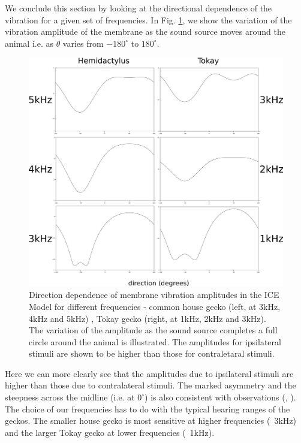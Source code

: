 We conclude this section by looking at the directional dependence of the vibration for a given set of frequencies. In Fig. \ref{directionplots}, we show the variation of the vibration amplitude of the membrane as
the sound source moves around the animal i.e. as $\theta$ varies from $-180^\circ$ to $180^\circ$.
\begin{figure}[ht!]
\centering
  \includegraphics[width=.5\linewidth]{Diagrams/Plots/directionplots/directionplots.png}
  \caption[Direction dependence of membrane vibration amplitudes for different frequencies.]{Direction dependence of membrane vibration amplitudes  in the ICE Model for different frequencies - common house gecko (left, at 3kHz, 4kHz and 5kHz)
  , Tokay gecko (right, at 1kHz, 2kHz and 3kHz).
  The variation of the amplitude as the sound source completes a full circle around the animal is illustrated. The amplitudes for ipsilateral stimuli are shown to be
  higher than those for contraletaral stimuli.}
  \label{directionplots}
\end{figure}
Here we can more clearly see that the amplitudes due to ipsilateral stimuli are higher than those due to contralateral stimuli. The marked asymmetry and the steepness across the midline (i.e. at $0^\circ$)
is also consistent with observations (\cite{dalsgaardmanley1}, \cite{dalsgaardmanley2}). The choice of our frequencies has to do with the typical hearing ranges of the geckos. The smaller house
gecko is most sensitive at higher frequencies (~3kHz) and the larger Tokay gecko at lower frequencies (~1kHz).

